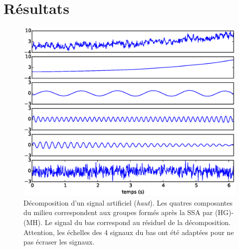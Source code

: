 \documentclass{gretsi}
\newcommand{\set}[1]{\left \{ 1, \dots, #1 \right \}}
\begin{document}
       

\section{Résultats}
\label{sec:res}

    \begin{figure}[tp]
        \centering
        \includegraphics[width=.5\textwidth]{img/artsig3.eps}
        \caption{Décomposition d'un signal artificiel (\emph{haut}). Les quatres composantes du milieu correspondent aux groupes formés après la SSA par (HG)-(MH). Le signal du bas correspond au résiduel de la décomposition. Attention, les échelles des 4 signaux du bas ont été adaptées pour ne pas écraser les signaux.} %
        \label{fig:dec}
    \end{figure}
\end{document}
